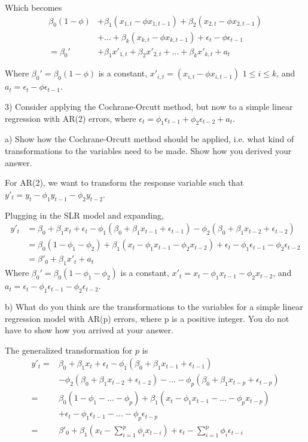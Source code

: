\documentclass{article}
\begin{document}
\begin{flushleft}
Which becomes
\begin{align*}
\beta_0(1-\phi)&+\beta_1(x_{1,t}-\phi x_{1,t-1})+\beta_2(x_{2,t}-\phi x_{2,t-1}) \\
&+ ... + \beta_k(x_{k,t}-\phi x_{k,t-1})+\epsilon_t -\phi\epsilon_{t-1}\\
=\beta_0' &+ \beta_1x'_{1,t}+ \beta_2x'_{2,t}+...+\beta_kx'_{k,t}+a_t
\end{align*}

Where $\beta_0' = \beta_0(1-\phi)$ is a constant, $x'_{i,t}= (x_{i,t}-\phi x_{i,t-1})$ $1\leq i \leq k$, and $a_t = \epsilon_t -\phi\epsilon_{t-1}$.\newline

3) Consider applying the Cochrane-Orcutt method, but now to a simple linear regression with AR(2) errors, where $\epsilon_t =\phi_1\epsilon_{t-1}+\phi_2\epsilon_{t-2} + a_t$.\newline

a) Show how the Cochrane-Orcutt method should be applied, i.e. what kind of transformations to the variables need to be made. Show how you derived your answer.\newline

For AR(2), we want to transform the response variable such that $y'_t=y_t-\phi_1 y_{t-1}-\phi_2 y_{t-2}$.\newline

Plugging in the SLR model and expanding,
\begin{align*}
y'_t&=\beta_0+\beta_1x_t+\epsilon_t - \phi_1(\beta_0+\beta_1x_{t-1}+\epsilon_{t-1})-\phi_2(\beta_0+\beta_1x_{t-2}+\epsilon_{t-2})\\
&=\beta_0(1-\phi_1-\phi_2)+\beta_1(x_t-\phi_1x_{t-1}-\phi_2x_{t-2})+\epsilon_t-\phi_1\epsilon_{t-1}-\phi_2\epsilon_{t-2}\\
&=\beta'_0 +\beta_1x'_t+a_t
\end{align*}
Where $\beta_0' = \beta_0(1-\phi_1-\phi_2)$ is a constant, $x'_t = x_t-\phi_1x_{t-1}-\phi_2x_{t-2}$, and $a_t=\epsilon_t-\phi_1\epsilon_{t-1}-\phi_2\epsilon_{t-2}$.\newline

b) What do you think are the transformations to the variables for a simple linear regression model with AR(p) errors, where p is a positive integer. You do not have to show how you arrived at your answer.\newline

The generalized transformation for $p$ is
\begin{align*}
y'_t=&\beta_0+\beta_1x_t+\epsilon_t - \phi_1(\beta_0+\beta_1x_{t-1}+\epsilon_{t-1})\\
&-\phi_2(\beta_0+\beta_1x_{t-2}+\epsilon_{t-2})-...-\phi_p(\beta_0+\beta_1x_{t-p}+\epsilon_{t-p})\\
=&\beta_0(1-\phi_1-...-\phi_p)+\beta_1(x_t-\phi_1x_{t-1}-...-\phi_px_{t-p})\\
&+\epsilon_t-\phi_1\epsilon_{t-1}-...-\phi_p\epsilon_{t-p}\\
=&\beta'_0+\beta_1(x_t-\sum_{i=1}^p \phi_ix_{t-i}) + \epsilon_t - \sum_{i=1}^p\phi_i\epsilon_{t-i}
\end{align*}


\end{flushleft}
\end{document}
